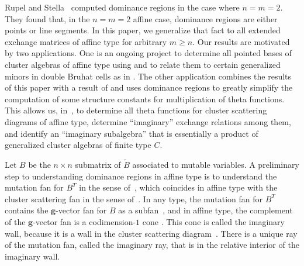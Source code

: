 \documentclass{amsart}
\theoremstyle{definition}
\theoremstyle{remark}
\numberwithin{equation}{section}
\newcommand{\0}{{\mathbf{0}}}
\newcommand{\g}{\mathbf{g}}
\newcommand{\tB}{{\widetilde{B}}}
\begin{document}
Rupel and Stella~\cite{RSDom} computed dominance regions in the case where $n=m=2$. 
They found that, in the $n=m=2$ affine case, dominance regions are either points or line segments.
In this paper, we generalize that fact to all extended exchange matrices of affine type for arbitrary $m\ge n$.
Our results are motivated by two applications.  
One is an ongoing project to determine all pointed bases of cluster algebras of affine type using \cite[Theorem~1.2.1]{FanQin} and to relate them to certain generalized minors in double Bruhat cells as in \cite{RSW19}.
The other application combines the results of this paper with a result of \cite{canonical} and uses dominance regions to greatly simplify the computation of some structure constants for multiplication of theta functions.
This allows us, in~\cite{afftheta}, to determine all theta functions for cluster scattering diagrams of affine type, determine ``imaginary'' exchange relations among them, and identify an ``imaginary subalgebra'' that is essentially a product of generalized cluster algebras of finite type $C$.

Let $B$ be the $n\times n$ submatrix of $\widetilde B$ associated to mutable variables.
A preliminary step to understanding dominance regions in affine type is to understand the mutation fan for $B^T$ in the sense of~\cite{universal}, which coincides in affine type \mbox{\cite[Theorem~2.10]{affscat}} with the cluster scattering fan in the sense of~\cite{scatfan}.
In any type, the mutation fan for $B^T$ contains the $\g$-vector fan for $B$ as a subfan~\cite[Theorem~8.7]{universal}, and in affine type, the complement of the $\g$-vector fan is a codimension-$1$ cone \mbox{\cite[Corollaries~1.3, 4.9]{afframe}}.
This cone is called the imaginary wall, because it is a wall in the cluster scattering diagram~\cite{affscat}.
There is a unique ray of the mutation fan, called the imaginary ray, that is in the relative interior of the imaginary wall.  
\end{document}
